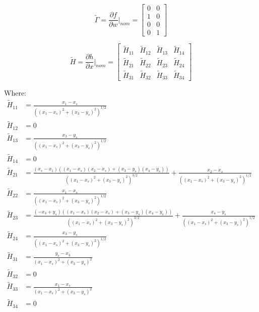 \documentclass[11pt, a4paper]{article}
\begin{document}
$$
\tilde{\Gamma} = \frac{\partial f}{\partial w} \biggr\rvert_{nom} = 
\left[\begin{matrix}0 & 0\\1 & 0\\0 & 0\\0 & 1\end{matrix}\right]
$$

$$
\tilde{H} = \frac{\partial h}{\partial x} \biggr\rvert_{nom} = 
\left[\begin{matrix}
\tilde{H}_{11} & \tilde{H}_{12} & \tilde{H}_{13} &  \tilde{H}_{14}\\
\tilde{H}_{21} & \tilde{H}_{22} & \tilde{H}_{23} &  \tilde{H}_{24}\\
\tilde{H}_{31} & \tilde{H}_{32} & \tilde{H}_{33} &  \tilde{H}_{34}
\end{matrix}\right]
$$

Where: 
\begin{align*}
\tilde{H}_{11} &= \frac{x_{1} - x_s}{\left(\left(x_{1} - x_s\right)^{2} + \left(x_{3} - y_s\right)^{2}\right)^{1/2}} \\
\tilde{H}_{12} &= 0 \\
\tilde{H}_{13} &= \frac{x_{3} - y_s}{\left(\left(x_{1} - x_s\right)^{2} + \left(x_{3} - y_s\right)^{2}\right)^{1/2}} \\
\tilde{H}_{14} &= 0 \\
\tilde{H}_{21} &= \frac{\left(x_s - x_{1}\right) \left(\left(x_{1} - x_s\right) \left(x_{2} - \dot{x}_s\right) + \left(x_{3} - y_s\right) \left(x_{4} - \dot{y}_s\right)\right)}{\left(\left(x_{1} - x_s\right)^{2} + \left(x_{3} - y_s\right)^{2}\right)^{3/2}} + \frac{x_{2} - \dot{x}_s}{\left(\left(x_{1} - x_s\right)^{2} + \left(x_{3} - y_s\right)^{2}\right)^{1/2}} \\
\tilde{H}_{22} &= \frac{x_{1} - x_s}{\left(\left(x_{1} - x_s\right)^{2} + \left(x_{3} - y_s\right)^{2}\right)^{1/2}} \\
\tilde{H}_{23} &= \frac{\left(- x_{3} + y_s\right) \left(\left(x_{1} - x_s\right) \left(x_{2} - \dot{x}_s\right) + \left(x_{3} - y_s\right) \left(x_{4} - \dot{y}_s\right)\right)}{\left(\left(x_{1} - x_s\right)^{2} + \left(x_{3} - y_s\right)^{2}\right)^{3/2}} + \frac{x_{4} - \dot{y}_s}{\left(\left(x_{1} - x_s\right)^{2} + \left(x_{3} - y_s\right)^{2}\right)^{1/2}} \\
\tilde{H}_{24} &= \frac{x_{3} - y_s}{\left(\left(x_{1} - x_s\right)^{2} + \left(x_{3} - y_s\right)^{2}\right)^{1/2}}\\
\tilde{H}_{31} &= \frac{y_s - x_{3}}{\left(x_{1} - x_s\right)^{2} + \left(x_{3} - y_s\right)^{2}} \\
\tilde{H}_{32} &= 0 \\
\tilde{H}_{33} &= \frac{x_{1} - x_s}{\left(x_{1} - x_s\right)^{2} + \left(x_{3} - y_s\right)^{2}} \\
\tilde{H}_{34} &= 0 \\
\end{align*}
\end{document}
